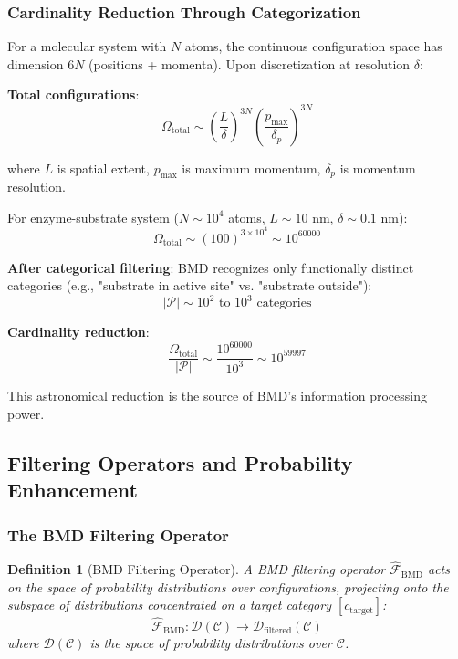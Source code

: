 \documentclass[11pt,a4paper]{article}
\newtheorem{definition}{Definition}[section]
\begin{document}
\subsubsection{Cardinality Reduction Through Categorization}

For a molecular system with $N$ atoms, the continuous configuration space has dimension $6N$ (positions + momenta). Upon discretization at resolution $\delta$:

\textbf{Total configurations}:
\begin{equation}
\Omega_{\text{total}} \sim \left(\frac{L}{\delta}\right)^{3N} \left(\frac{p_{\max}}{\delta_p}\right)^{3N}
\end{equation}

where $L$ is spatial extent, $p_{\max}$ is maximum momentum, $\delta_p$ is momentum resolution.

For enzyme-substrate system ($N \sim 10^4$ atoms, $L \sim 10$ nm, $\delta \sim 0.1$ nm):
\begin{equation}
\Omega_{\text{total}} \sim (100)^{3 \times 10^4} \sim 10^{60000}
\end{equation}

\textbf{After categorical filtering}: BMD recognizes only functionally distinct categories (e.g., "substrate in active site" vs. "substrate outside"):
\begin{equation}
|\mathcal{P}| \sim 10^2 \text{ to } 10^3 \text{ categories}
\end{equation}

\textbf{Cardinality reduction}:
\begin{equation}
\frac{\Omega_{\text{total}}}{|\mathcal{P}|} \sim \frac{10^{60000}}{10^3} \sim 10^{59997}
\end{equation}

This astronomical reduction is the source of BMD's information processing power.

\subsection{Filtering Operators and Probability Enhancement}

\subsubsection{The BMD Filtering Operator}

\begin{definition}[BMD Filtering Operator]
A BMD filtering operator $\hat{\mathcal{F}}_{\text{BMD}}$ acts on the space of probability distributions over configurations, projecting onto the subspace of distributions concentrated on a target category $[c_{\text{target}}]$:
\begin{equation}
\hat{\mathcal{F}}_{\text{BMD}}: \mathcal{D}(\mathcal{C}) \to \mathcal{D}_{\text{filtered}}(\mathcal{C})
\end{equation}
where $\mathcal{D}(\mathcal{C})$ is the space of probability distributions over $\mathcal{C}$.
\end{definition}
\end{document}
